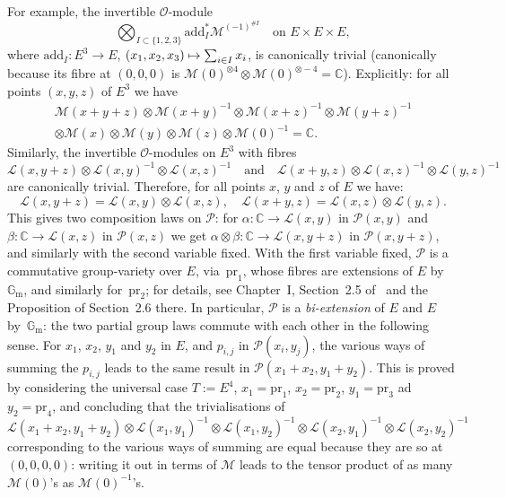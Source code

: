 \documentclass[JEP,XML,SOM,Unicode,NoFloatCountersInSection]{cedram}
\let\mathcal\mathscr
\def\mto{\mathchoice{\longmapsto}{\mapsto}{\mapsto}{\mapsto}}
\theoremstyle{plain}
\theoremstyle{definition}
\numberwithin{equation}{subsection}
\renewcommand{\C}{\mathbb C}
\renewcommand{\G}{\mathbb G}
\newcommand{\calL}{\mathcal{L}}
\newcommand{\calM}{\mathcal{M}}
\newcommand{\calO}{\mathcal{O}}
\newcommand{\calP}{\mathcal{P}}
\newcommand{\add}{\mathrm{add}}
\newcommand{\Gm}{\G_{\mathrm{m}}}
\newcommand{\pr}{\mathrm{pr}}
\begin{document}
For example, the invertible $\calO$-module
\[
\bigotimes_{I\subset\{1,2,3\}}\add_I^*\calM^{(-1)^{\# I}} \quad \text{on $E\times E\times E$},
\]
where $\add_I\colon E^3\to E$, $(x_1,x_2,x_3)\mto\sum_{i\in I}x_i$, is canonically
trivial (canonically because its fibre at $(0,0,0)$ is
$\calM(0)^{\otimes 4}\otimes\calM(0)^{\otimes-4}=\C$).
Explicitly: for all points $(x,y,z)$ of $E^3$ we have
\begin{multline*}
\calM(x+y+z)\otimes\calM(x+y)^{-1}\otimes\calM(x+z)^{-1}\otimes\calM(y+z)^{-1} \\
\otimes\calM(x)\otimes\calM(y)\otimes\calM(z) \otimes\calM(0)^{-1}=\C.
\end{multline*}
Similarly, the invertible $\calO$-modules on $E^3$ with fibres
\[
\calL(x,y+z)\otimes\calL(x,y)^{-1}\otimes\calL(x,z)^{-1}
\quad\text{and}\quad
\calL(x+y,z)\otimes\calL(x,z)^{-1}\otimes\calL(y,z)^{-1}
\]
are canonically trivial. Therefore, for all points $x$, $y$ and $z$ of
$E$ we have:
\begin{equation}\label{eqn:L=biadditive}
\calL(x,y+z) = \calL(x,y)\otimes\calL(x,z),
\quad \calL(x+y,z)=\calL(x,z)\otimes\calL(y,z).
\end{equation}
This gives two composition laws on $\calP$: for
$\alpha\colon\C\to\calL(x,y)$ in $\calP(x,y)$ and
$\beta\colon\C\to\calL(x,z)$ in $\calP(x,z)$ we get
$\alpha\otimes\beta\colon\C\to\calL(x,y+z)$ in $\calP(x,y+z)$, and
similarly with the second variable fixed. With the first variable fixed,
$\calP$ is a commutative group-variety over $E$, via~$\pr_1$, whose
fibres are extensions of $E$ by~$\Gm$, and similarly for~$\pr_2$; for
details, see Chapter~I, Section~2.5 of~\cite{Moret-Bailly} and the Proposition
of Section~2.6 there. In particular, $\calP$ is a \emph{bi-extension} of $E$
and $E$ by~$\Gm$: the two partial group laws commute with each other
in the following sense. For $x_1$, $x_2$, $y_1$ and $y_2$ in $E$, and
$p_{i,j}$ in $\calP(x_i,y_j)$, the various ways of summing the
$p_{i,j}$ leads to the same result in $\calP(x_1+x_2,y_1+y_2)$. This
is proved by considering the universal case $T:=E^4$, $x_1=\pr_1$,
$x_2=\pr_2$, $y_1=\pr_3$ ad $y_2=\pr_4$, and concluding that the
trivialisations of
\[
\calL(x_1+x_2,y_1+y_2)\otimes\calL(x_1,y_1)^{-1}\otimes\calL(x_1,y_2)^{-1}
\otimes\calL(x_2,y_1)^{-1}\otimes\calL(x_2,y_2)^{-1}
\]
corresponding to the various ways of summing are equal because they
are so at $(0,0,0,0)$: writing it out in terms of $\calM$ leads to the
tensor product of as many $\calM(0)$'s as $\calM(0)^{-1}$'s.
\end{document}
